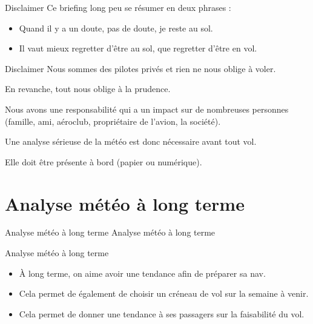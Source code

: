 \documentclass{beamer}
\begin{document}
\begin{frame}{Disclaimer}
  Ce briefing long peu se résumer en deux phrases :
  
  \begin{itemize}
    \item Quand il y a un doute, pas de doute, je reste au sol.
    \item Il vaut mieux regretter d'être au sol, que regretter d'être en vol.
  \end{itemize}  
\end{frame}

\begin{frame}{Disclaimer}
  Nous sommes des pilotes privés et rien ne nous oblige à voler.

  En revanche, tout nous oblige à la prudence.

  Nous avons une responsabilité qui a un impact sur de nombreuses
  personnes (famille, ami, aéroclub, propriétaire de l'avion, la société).

  Une analyse sérieuse de la météo est donc nécessaire avant tout vol.

  Elle doit être présente à bord (papier ou numérique).
\end{frame}

\section{Analyse météo à long terme}
\begin{frame}{Analyse météo à long terme}
  \LARGE{Analyse météo à long terme}
\end{frame}

\begin{frame}{Analyse météo à long terme}
  \begin{itemize}
    \item À long terme, on aime avoir une tendance afin de préparer sa nav.\pause
    \item Cela permet de également de choisir un créneau de vol sur la semaine à venir.\pause
    \item Cela permet de donner une tendance à ses passagers sur la faisabilité du vol.
  \end{itemize}
\end{frame}
\end{document}
